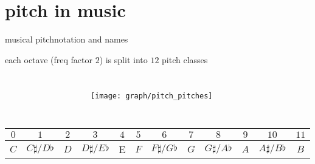     \section[musical pitch]{pitch in music}
        \begin{frame}{musical pitch}{notation and names}
            
            each octave (freq factor $2$) is split into $12$ pitch classes
            \begin{columns}
            \begin{figure}
            \scalebox{.8}
            {
                
            }
            \end{figure}
            \begin{figure}
                \texttt{[image: graph/pitch\_pitches]}
            \end{figure}
            \end{columns}

            \begin{footnotesize}
                \begin{table}
                    \centering
                    \begin{tabular}{cccccccccccc} %
                        \\ \hline
                        \bf{\emph{$0$}}	 & \bf{\emph{$1$}}	 & \bf{\emph{$2$}}	 & \bf{\emph{$3$}}	 & \bf{\emph{$4$}}	 & \bf{\emph{$5$}}	 & \bf{\emph{$6$}}	 & \bf{\emph{$7$}}	 & \bf{\emph{$8$}}	 & \bf{\emph{$9$}}	 & \bf{\emph{$10$}}	 & \bf{\emph{$11$}}\\ 
                         \hline
                        \bf{$C$}	 & $C\sharp / D\flat$	 & $D$	 & $D\sharp / E\flat$	 & E	 & $F$	 & $F\sharp / G\flat$	 & $G$	 & $G\sharp / A\flat$	 & $A$	 & $A\sharp / B\flat$	 & $B$\\
                    \end{tabular}
                \end{table}
            \end{footnotesize}
        \end{frame}
        
